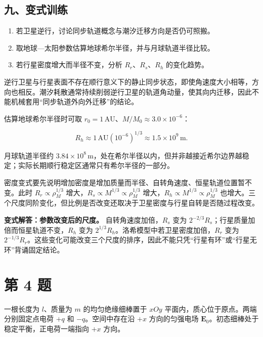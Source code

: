 \documentclass[12pt,a4paper,UTF8]{ctexart}
\newcommand{\tightlist}{\setlength{\itemsep}{0pt}\setlength{\parskip}{0pt}}
\begin{document}
\subsection{九、变式训练}\label{ux4e5dux53d8ux5f0fux8badux7ec3-2}

\begin{enumerate}
\def\labelenumi{\arabic{enumi}.}
\tightlist
\item
  若卫星逆行，讨论同步轨道概念与潮汐迁移方向是否仍可照搬。
\item
  取地球---太阳参数估算地球希尔半径，并与月球轨道半径比较。
\item
  若行星密度增大而半径不变，分析 \(R_r\)、\(R_s\)、\(R_h\) 的变化趋势。
\end{enumerate}

逆行卫星与行星表面不存在顺行意义下的静止同步状态，即使角速度大小相等，方向也相反。潮汐耗散通常持续削弱逆行卫星的轨道角动量，使其向内迁移，因此不能机械套用``同步轨道外向外迁移''的结论。

估算地球希尔半径时可取
\(r_0=1\,\mathrm{AU}\)、\(M/M_0\approx3.0\times10^{-6}\)：

\[R_h\approx1\,\mathrm{AU}\left(10^{-6}\right)^{1/3}
\approx1.5\times10^9\,\mathrm m.\]

月球轨道半径约
\(3.84\times10^8\,\mathrm m\)，处在希尔半径以内，但并非越接近希尔边界越稳定；实际长期顺行稳定区通常只有希尔半径的一部分。

密度变式要先说明增加密度是增加质量而半径、自转角速度、恒星轨道位置暂不变。此时
\(R_r\propto\rho_M^{1/3}\)
增大，\(R_s\propto M^{1/3}\propto\rho_M^{1/3}\)
增大，\(R_h\propto M^{1/3}\propto\rho_M^{1/3}\)
也增大。三个尺度同阶变化，但比例是否改变还取决于卫星密度与行星自转是否随过程改变。

\textbf{变式解答：参数改变后的尺度。} 自转角速度加倍，\(R_s\) 变为
\(2^{-2/3}R_s\)；行星质量加倍而恒星轨道不变，\(R_h\) 变为
\(2^{1/3}R_h\)。洛希模型中若卫星密度加倍，\(R_r\) 变为
\(2^{-1/3}R_r\)。这些变化可能改变三个尺度的排序，因此不能只凭``行星有环''或``行星无环''背诵固定结论。

\newpage

\section{第 4 题}\label{ux7b2c-4-ux9898}

一根长度为 \(l\)、质量为 \(m\) 的均匀绝缘细棒置于 \(xOy\)
平面内，质心位于原点。两端分别固定点电荷 \(+q\) 和 \(-q\)。空间中存在沿
\(+x\) 方向的匀强电场 \(\bm E_0\)。初态细棒处于稳定平衡，正电荷一端指向
\(+x\) 方向。
\end{document}
